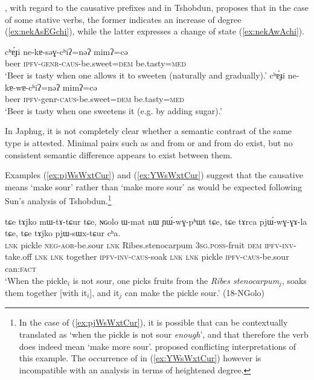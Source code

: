 \citet{jackson06paisheng, jackson14morpho}, with regard to the causative prefixes  and  in Tshobdun, proposes that in the case of some stative verbs, the former indicates an increase of degree (\ref{ex:nekAsEGchi}), while the latter expresses a change of state (\ref{ex:nekAwAchi}). 

\begin{exe}
\ex 
\begin{xlist}
\ex \label{ex:nekAsEGchi}
\gll cʰɐ́ɟi ne-kɐ-səɣ-cʰiʔ=nəʔ mimʔ=cə \\
beer \textsc{ipfv}-\textsc{genr}-\textsc{caus}-be.sweet=\textsc{dem} be.tasty=\textsc{med} \\
\glt ‘Beer is tasty when one allows it to sweeten (naturally and gradually).’
\ex \label{ex:nekAwAchi}
\gll cʰɐ́ɟi ne-kɐ-wɐ-cʰiʔ=nəʔ mimʔ=cə \\
beer \textsc{ipfv}-genr-\textsc{caus}-be.sweet=\textsc{dem} be.tasty=\textsc{med} \\
\glt ‘Beer is tasty when one sweetens it (e.g. by adding sugar).’
\end{xlist}
\end{exe}

In Japhug, it is not completely clear whether a semantic contrast of the same type is attested. Minimal pairs such as  and  from  or  and  from  do exist, but no consistent semantic difference appears to exist between them.

Examples (\ref{ex:pjWsWxtCur}) and (\ref{ex:YWsWxtCur}) suggest that the causative   means `make sour' rather than `make more sour' as would be expected following Sun's analysis of Tshobdun.\footnote{In the case of (\ref{ex:pjWsWxtCur}), it is possible that  can be contextually translated as `when the pickle is not sour \textit{enough}', and that therefore the verb  does indeed mean `make more sour'.  proposed conflicting interpretations of this example. The occurrence of  in (\ref{ex:YWsWxtCur}) however is incompatible with an analysis in terms of heightened degree. } 

 \begin{exe}
\ex \label{ex:pjWsWxtCur}
\gll tɕe tɤjko mɯ-tɤ-tɕur tɕe, ɴɢolo ɯ-mat nɯ ɲɯ́-wɣ-pʰɯt tɕe, tɕe tɤrca pjɯ́-wɣ-ɣɤ-la tɕe, tɕe tɤjko pjɯ-sɯx-tɕur cʰa. \\
\textsc{lnk} pickle \textsc{neg}-\textsc{aor}-be.sour \textsc{lnk}  Ribes.stenocarpum \textsc{3sg}.\textsc{poss}-fruit \textsc{dem} \textsc{ipfv}-\textsc{inv}-take.off \textsc{lnk} \textsc{lnk}  together \textsc{ipfv}-\textsc{inv}-\textsc{caus}-soak \textsc{lnk} \textsc{lnk} pickle \textsc{ipfv}-\textsc{caus}-be.sour can:\textsc{fact} \\
\glt `When the pickle$_i$ is not sour, one picks fruits from the \textit{Ribes stenocarpum}$_j$, soaks them together [with it$_i$], and it$_j$ can make the pickle sour.' (18-NGolo)
\end{exe}

